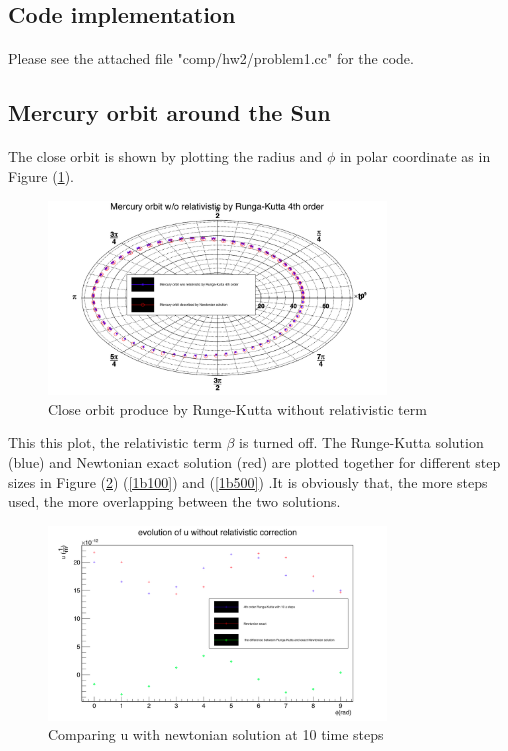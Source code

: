 \subsection{Code implementation}
\paragraph{}
Please see the attached file "comp/hw2/problem1.cc" for the code.

\subsection{Mercury orbit around the Sun}
\paragraph{}
  The close orbit is shown by plotting the radius and $\phi$ in polar coordinate as in Figure (\ref{polar}).


\begin{figure}[!htbp]
\begin{center}
\includegraphics[width=0.8\textwidth]{1_b_polar_1.png}
\caption{Close orbit produce by Runge-Kutta without relativistic term }
\label{polar}
\end{center}
\end{figure}

This this plot, the relativistic term $ \beta$ is turned off. The Runge-Kutta solution (blue) and Newtonian exact solution (red) are plotted together for different step sizes in Figure (\ref{1b10}) (\ref{1b100}) and (\ref{1b500}) .It is obviously that, the more steps used, the more overlapping between the two solutions.

\begin{figure}[!htbp]
\begin{center}
\includegraphics[width=0.8\textwidth]{1_b_n10.png}
\caption{Comparing u with newtonian solution at 10 time steps}
\label{1b10}
\end{center}
\end{figure}

